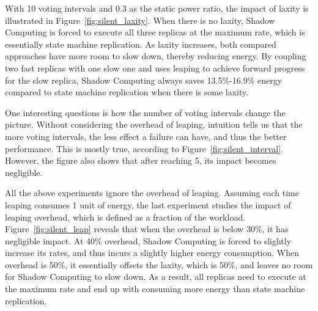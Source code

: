 With 10 voting intervals and 0.3 as the static power ratio, the impact of laxity is illustrated in Figure~\ref{fig:silent_laxity}. When there is no laxity, Shadow Computing is forced to execute all three replicas at the maximum rate, which is essentially state machine replication. As laxity increases, both compared approaches have more room to slow down, thereby reducing energy. By coupling two fast replicas with one slow one and uses leaping to achieve forward progress for the slow replica, Shadow Computing always saves 13.5\%-16.9\% energy compared to state machine replication when there is some laxity.

One interesting questions is how the number of voting intervals change the picture. Without considering the overhead of leaping, intuition tells us that the more voting intervals, the less effect a failure can have, and thus the better performance. This is mostly true, according to Figure~\ref{fig:silent_interval}. However, the figure also shows that after reaching 5, its impact becomes negligible. 

All the above experiments ignore the overhead of leaping. Assuming each time leaping consumes 1 unit of energy, the last experiment studies the impact of leaping overhead, which is defined as a fraction of the workload. Figure~\ref{fig:silent_leap} reveals that when the overhead is below 30\%, it has negligible impact. At 40\% overhead, Shadow Computing is forced to slightly increase its rates, and thus incurs a slightly higher energy consumption. When overhead is 50\%, it essentially offsets the laxity, which is 50\%, and leaves no room for Shadow Computing to slow down. As a result, all replicas need to execute at the maximum rate and end up with consuming more energy than state machine replication.  





